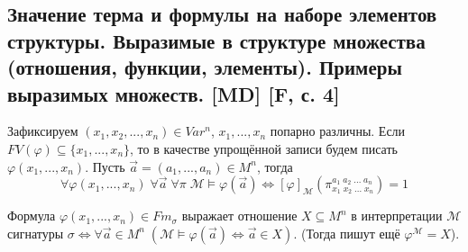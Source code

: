 \documentclass[a4paper, fleqn]{article}
\begin{document}
    \subsection{Значение терма и формулы на наборе элементов структуры. Выразимые в структуре множества (отношения, функции, элементы). Примеры выразимых множеств. [MD] [F, с. 4]}
    \begin{proposition}
        Зафиксируем $(x_1, x_2, ..., x_n) \in Var^n$, $x_1, ..., x_n$ попарно различны. Если $FV(\varphi) \subseteq \{x_1, ..., x_n\}$, то в качестве упрощённой записи будем писать $\varphi(x_1, ..., x_n)$. Пусть $\overrightarrow{a} = (a_1, ..., a_n) \in M^n$, тогда
        \[\forall \varphi(x_1, ..., x_n) \; \forall \overrightarrow{a} \; \forall \mathcal{\pi} \; \mathcal{M} \vDash \varphi(\overrightarrow{a}) \Leftrightarrow [\varphi]_{\mathcal{M}} (\pi_{x_1 \; x_2 \; ... \; x_n}^{a_1 \; a_2 \; ... \; a_n}) = 1\]
    \end{proposition}

    \begin{definition}
        Формула $\varphi(x_1, ..., x_n) \in Fm_{\sigma}$ выражает отношение $X \subseteq M^n$ в интерпретации $\mathcal{M}$ сигнатуры $\sigma \Leftrightarrow \forall \overrightarrow{a} \in M^n \; (\mathcal{M} \vDash \varphi(\overrightarrow{a}) \Leftrightarrow \overrightarrow{a} \in X)$. (Тогда пишут ещё $\varphi^{\mathcal{M}} = X$).
    \end{definition}
\end{document}
